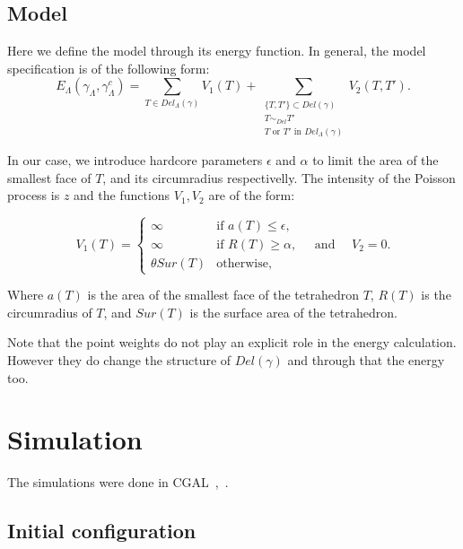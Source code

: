 \documentclass[12pt,a4paper]{report}
\begin{document}
\subsection{Model}
Here we define the model through its energy function. In general, the model specification is of the following form:
$$E_\Lambda(\gamma_\Lambda, \gamma_\Lambda^c)= \sum_{T \in Del_\Lambda(\gamma)} V_1(T) + \sum_{\substack{\{T,T'\} \subset Del(\gamma) \\ T\sim_{Del} T' \\ T \text{ or  } T' \text{ in  } Del_\Lambda(\gamma)}} V_2(T,T').$$

In our case, we introduce hardcore parameters $\epsilon$ and $\alpha$ to limit the area of the smallest face of $T$, and its circumradius respectivelly. The intensity of the Poisson process is $z$ and the functions $V_1, V_2$ are of the form:


\begin{equation}\label{model}
V_1(T) = 
\left\{
    \begin{array}{ll}
        \infty & \mbox{if } a(T)\leq \epsilon, \\
        \infty & \mbox{if } R(T)\geq \alpha, \\
        \theta Sur(T) & \mbox{otherwise, }
    \end{array}
\right. \quad \mbox{and } \quad V_2 = 0.
\end{equation}

Where $a(T)$ is the area of the smallest face of the tetrahedron $T$, $R(T)$ is the circumradius of $T$, and $Sur(T)$ is the surface area of the tetrahedron.

Note that the point weights do not play an explicit role in the energy calculation. However they do change the structure of $Del(\gamma)$ and through that the energy too.




\section{Simulation}
The simulations were done in CGAL~\cite{cgal},~\cite{cgal:3d-triang}.
\subsection{Initial configuration}
\end{document}

